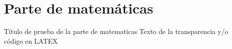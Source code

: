 \section{Parte de matemáticas}

\begin{frame}{Título de prueba de la parte de matematicas}
	Texto de la transparencia y/o código en LATEX
\end{frame}
